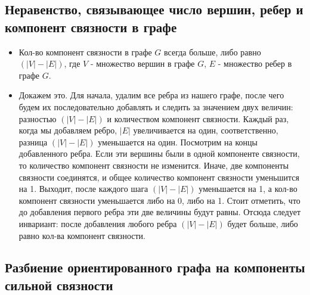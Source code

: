 \documentclass{article}
\begin{document}
    \subsection{Неравенство, связывающее число вершин, ребер и компонент связности в графе}
    \begin{itemize}
    \item
    Кол-во компонент связности в графе $G$ всегда больше, либо равно $(|V| - |E|)$, где $V$ - множество вершин в графе $G$, $E$ - множество ребер в графе $G$. 

    \item 
    Докажем это. Для начала, удалим все ребра из нашего графе, после чего будем их последовательно добавлять и следить за значением двух величин: разностью $(|V| - |E|)$ и количеством компонент связности. Каждый раз, когда мы добавляем ребро, $|E|$ увеличивается на один, соответственно, разница $(|V| - |E|)$ уменьшается на один. Посмотрим на концы добавленного ребра. Если эти вершины были в одной компоненте связности, то количество компонент связности не изменится. Иначе, две компоненты связности соединятся, и общее количество компонент связности уменьшится на 1. Выходит, после каждого шага $(|V| - |E|)$ уменьшается на 1, а кол-во компонент связности уменьшается либо на 0, либо на 1. Стоит отметить, что до добавления первого ребра эти две величины будут равны. Отсюда следует инвариант: после добавления любого ребра $(|V| - |E|)$ будет больше, либо равно кол-ва компонент связности. 
    \end{itemize}

    \subsection{Разбиение ориентированного графа на компоненты сильной связности}
\end{document}
